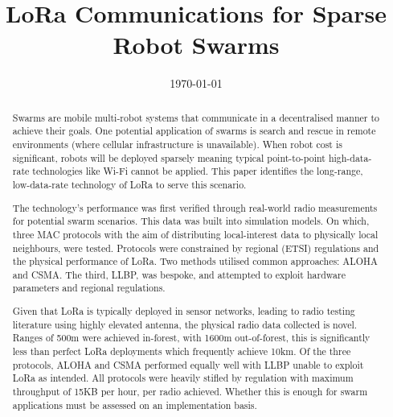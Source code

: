 \documentclass{ecsproject}
\begin{document}
\frontmatter
\title      {LoRa Communications for Sparse Robot Swarms}
\addresses  {\groupname\\\deptname\\\univname}
\date       {\today}
\subject    {}
\keywords   {}
\maketitle

\begin{abstract}

Swarms are mobile multi-robot systems that communicate in a decentralised manner to achieve their goals. One potential application of swarms is search and rescue in remote environments (where cellular infrastructure is unavailable). When robot cost is significant, robots will be deployed sparsely meaning typical point-to-point high-data-rate technologies like Wi-Fi cannot be applied. This paper identifies the long-range, low-data-rate technology of LoRa to serve this scenario. 

The technology's performance was first verified through real-world radio measurements for potential swarm scenarios. This data was built into simulation models. On which, three MAC protocols with the aim of distributing local-interest data to physically local neighbours, were tested. Protocols were constrained by regional (ETSI) regulations and the physical performance of LoRa. Two methods utilised common approaches: ALOHA and CSMA. The third, LLBP, was bespoke, and attempted to exploit hardware parameters and regional regulations. 

Given that LoRa is typically deployed in sensor networks, leading to radio testing literature using highly elevated antenna,  the physical radio data collected is novel. Ranges of 500m were achieved in-forest, with 1600m out-of-forest, this is significantly less than perfect LoRa deployments which frequently achieve 10km. Of the three protocols, ALOHA and CSMA performed equally well with LLBP unable to exploit LoRa as intended. All protocols were heavily stifled by regulation with maximum throughput of 15KB per hour, per radio achieved. Whether this is enough for swarm applications must be assessed on an implementation basis.
 
\end{abstract}

\newpage{}
\end{document}
